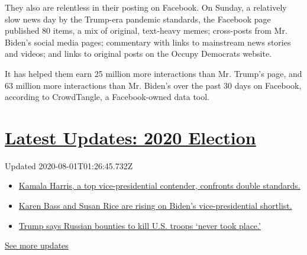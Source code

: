 They also are relentless in their posting on Facebook. On Sunday, a
relatively slow news day by the Trump-era pandemic standards, the
Facebook page published 80 items, a mix of original, text-heavy memes;
cross-posts from Mr. Biden's social media pages; commentary with links
to mainstream news stories and videos; and links to original posts on
the Occupy Democrats website.

It has helped them earn 25 million more interactions than Mr. Trump's
page, and 63 million more interactions than Mr. Biden's over the past 30
days on Facebook, according to CrowdTangle, a Facebook-owned data tool.

\hypertarget{latest-updates-2020-election}{%
\section{\texorpdfstring{\href{https://www.nytimes.com/2020/07/31/us/elections/biden-vs-trump.html?action=click\&pgtype=Article\&state=default\&region=MAIN_CONTENT_1\&context=storylines_live_updates}{Latest
Updates: 2020
Election}}{Latest Updates: 2020 Election}}\label{latest-updates-2020-election}}

Updated 2020-08-01T01:26:45.732Z

\begin{itemize}
\tightlist
\item
  \href{https://www.nytimes.com/2020/07/31/us/elections/biden-vs-trump.html?action=click\&pgtype=Article\&state=default\&region=MAIN_CONTENT_1\&context=storylines_live_updates\#link-29fdff45}{Kamala
  Harris, a top vice-presidential contender, confronts double
  standards.}
\item
  \href{https://www.nytimes.com/2020/07/31/us/elections/biden-vs-trump.html?action=click\&pgtype=Article\&state=default\&region=MAIN_CONTENT_1\&context=storylines_live_updates\#link-13ec3d9c}{Karen
  Bass and Susan Rice are rising on Biden's vice-presidential
  shortlist.}
\item
  \href{https://www.nytimes.com/2020/07/31/us/elections/biden-vs-trump.html?action=click\&pgtype=Article\&state=default\&region=MAIN_CONTENT_1\&context=storylines_live_updates\#link-49e9a016}{Trump
  says Russian bounties to kill U.S. troops `never took place.'}
\end{itemize}

\href{https://www.nytimes.com/2020/07/31/us/elections/biden-vs-trump.html?action=click\&pgtype=Article\&state=default\&region=MAIN_CONTENT_1\&context=storylines_live_updates}{See
more updates}

